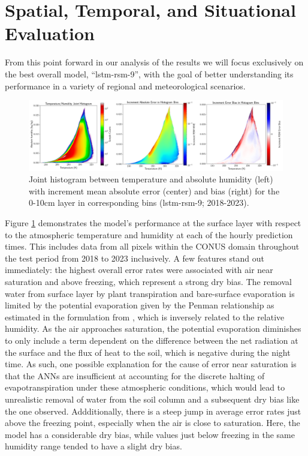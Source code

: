 \section{Spatial, Temporal, and Situational Evaluation}

From this point forward in our analysis of the results we will focus exclusively on the best overall model, ``lstm-rsm-9'', with the goal of better understanding its performance in a variety of regional and meteorological scenarios.

\begin{figure}[h!]
    \centering

    \includegraphics[width=.99\linewidth,draft=false]{figures/seq-eval_lstm-rsm-9/eval-grid_full_lstm-rsm-9_rsm-10_hist-humidity-temp_all-3.png}

    \caption{Joint histogram between temperature and absolute humidity (left) with increment mean absolute error (center) and bias (right) for the 0-10cm layer in corresponding bins (lstm-rsm-9; 2018-2023).}
    \label{bulk-eval_humidity-temp}
\end{figure}

Figure \ref{bulk-eval_humidity-temp} demonstrates the model's performance at the surface layer with respect to the atmospheric temperature and humidity at each of the hourly prediction times. This includes data from all pixels within the CONUS domain throughout the test period from 2018 to 2023 inclusively. A few features stand out immediately: the highest overall error rates were associated with air near saturation and above freezing, which represent a strong dry bias. The removal water from surface layer by plant transpiration and bare-surface evaporation is limited by the potential evaporation given by the Penman relationship as estimated in the formulation from \citep{mahrt_influence_1984}, which is inversely related to the relative humidity. As the air approaches saturation, the potential evaporation diminishes to only include a term dependent on the difference between the net radiation at the surface and the flux of heat to the soil, which is negative during the night time. As such, one possible explanation for the cause of error near saturation is that the ANNs are insufficient at accounting for the discrete halting of evapotranspiration under these atmospheric conditions, which would lead to unrealistic removal of water from the soil column and a subsequent dry bias like the one observed. Addditionally, there is a steep jump in average error rates just above the freezing point, especially when the air is close to saturation. Here, the model has a considerable dry bias, while values just below freezing in the same humidity range tended to have a slight dry bias.

